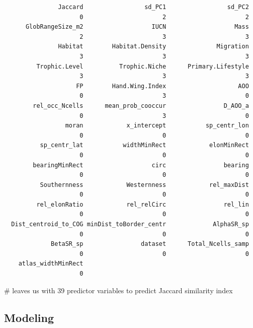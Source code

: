 \documentclass[
  letterpaper,
  DIV=11,
  numbers=noendperiod]{scrartcl}
\newenvironment{Shaded}{\begin{snugshade}}{\end{snugshade}}
\newcommand{\CommentTok}[1]{\textcolor[rgb]{0.37,0.37,0.37}{#1}}
\begin{document}
\begin{verbatim}
               Jaccard                 sd_PC1                 sd_PC2 
                     0                      2                      2 
      GlobRangeSize_m2                   IUCN                   Mass 
                     2                      3                      3 
               Habitat        Habitat.Density              Migration 
                     3                      3                      3 
         Trophic.Level          Trophic.Niche      Primary.Lifestyle 
                     3                      3                      3 
                    FP        Hand.Wing.Index                    AOO 
                     0                      3                      0 
        rel_occ_Ncells      mean_prob_cooccur                D_AOO_a 
                     0                      3                      0 
                 moran            x_intercept           sp_centr_lon 
                     0                      0                      0 
          sp_centr_lat           widthMinRect            elonMinRect 
                     0                      0                      0 
        bearingMinRect                   circ                bearing 
                     0                      0                      0 
          Southernness            Westernness            rel_maxDist 
                     0                      0                      0 
         rel_elonRatio            rel_relCirc                rel_lin 
                     0                      0                      0 
  Dist_centroid_to_COG minDist_toBorder_centr             AlphaSR_sp 
                     0                      0                      0 
             BetaSR_sp                dataset      Total_Ncells_samp 
                     0                      0                      0 
    atlas_widthMinRect 
                     0 
\end{verbatim}

\begin{Shaded}
\begin{Highlighting}[]
\CommentTok{\# leaves us with 39 predictor variables to predict Jaccard similarity index}
\end{Highlighting}
\end{Shaded}

\subsection{Modeling}\label{modeling}
\end{document}
